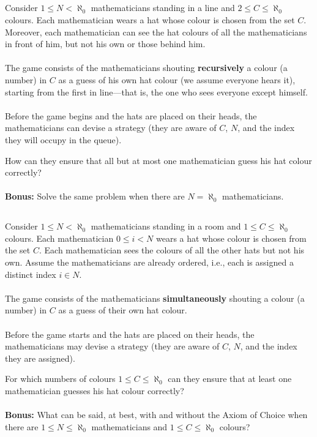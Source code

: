 \documentclass[11pt, a4paper, oneside]{article}
\theoremstyle{remark}
\begin{document}
\subsection{}
Consider \( 1 \leq N < \aleph_0 \) mathematicians standing in a line and \( 2 \leq C \leq \aleph_0 \) colours. Each mathematician wears a hat whose colour is chosen from the set \( C \). Moreover, each mathematician can see the hat colours of all the mathematicians in front of him, but not his own or those behind him.
\\\\
The game consists of the mathematicians shouting \textbf{recursively} a colour (a number) in \( C \) as a guess of his own hat colour (we assume everyone hears it), starting from the first in line—that is, the one who sees everyone except himself.
\\\\
Before the game begins and the hats are placed on their heads, the mathematicians can devise a strategy (they are aware of \( C \), \( N \), and the index they will occupy in the queue).

How can they ensure that all but at most one mathematician guess his hat colour correctly?
\\\\
\textbf{Bonus:} Solve the same problem when there are \(N = \aleph_0\) mathematicians.

\subsection{}
Consider \(\left.1 \leq N < \aleph_0\right.\) mathematicians standing in a room and \(\left.1 \leq C \leq \aleph_0\right.\) colours. Each mathematician \(\left.0 \leq i < N\right.\) wears a hat whose colour is chosen from the set \(C\). Each mathematician sees the colours of all the other hats but not his own. Assume the mathematicians are already ordered, i.e., each is assigned a distinct index \(i \in N\).
\\\\
The game consists of the mathematicians \textbf{simultaneously} shouting a colour (a number) in \(C\) as a guess of their own hat colour.
\\\\
Before the game starts and the hats are placed on their heads, the mathematicians may devise a strategy (they are aware of \(C\), \(N\), and the index they are assigned).

For which numbers of colours \(\left.1 \leq C \leq \aleph_0\right.\) can they ensure that at least one mathematician guesses his hat colour correctly?
\\\\
\textbf{Bonus:} What can be said, at best, with and without the Axiom of Choice when there are \(\left.1\leq N\leq \aleph_0\right.\) mathematicians and \(\left.1\leq C\leq \aleph_0\right.\) colours?
\end{document}
